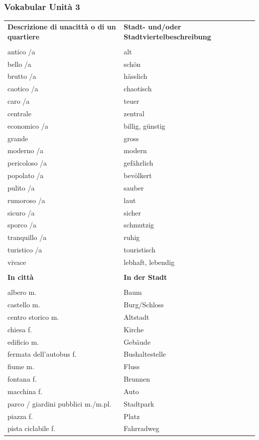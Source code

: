 \documentclass[10pt]{scrartcl}
\begin{document}
\begin{multicols*}{2}
\subsubsection*{Vokabular Unità 3}
\begin{supertabular}{p{4cm}p{4cm}}
\textbf{Descrizione di unacittà o di un quartiere} & \textbf{Stadt- und/oder Stadtviertelbeschreibung}\\
\\
antico /a & alt\\
bello /a & schön\\
brutto /a & hässlich\\
caotico /a & chaotisch\\
caro /a & teuer\\
centrale & zentral\\
economico /a & billig, günstig\\
grande & gross\\
moderno /a & modern\\
pericoloso /a & gefährlich\\
popolato /a & bevölkert\\
pulito /a & sauber\\
rumoroso /a & laut\\
sicuro /a & sicher\\
sporco /a & schmutzig\\
tranquillo /a & ruhig\\
turistico /a & touristisch\\
vivace & lebhaft, lebendig\\
\\
\textbf{In città} & \textbf{In der Stadt}\\
\\
albero \hfill m. & Baum\\
castello \hfill m. & Burg/Schloss\\
centro storico \hfill m. & Altstadt\\
chiesa \hfill f. & Kirche\\
edificio \hfill m. & Gebäude\\
fermata dell'autobus \hfill f. & Bushaltestelle\\
fiume \hfill m. & Fluss\\
fontana \hfill f. & Brunnen\\
macchina \hfill f. & Auto\\
parco / giardini pubblici  \hfill m./m.pl. & Stadtpark\\
piazza \hfill f. & Platz\\
pista ciclabile \hfill f. & Fahrradweg\\

\end{supertabular}
\end{multicols*}
\end{document}

